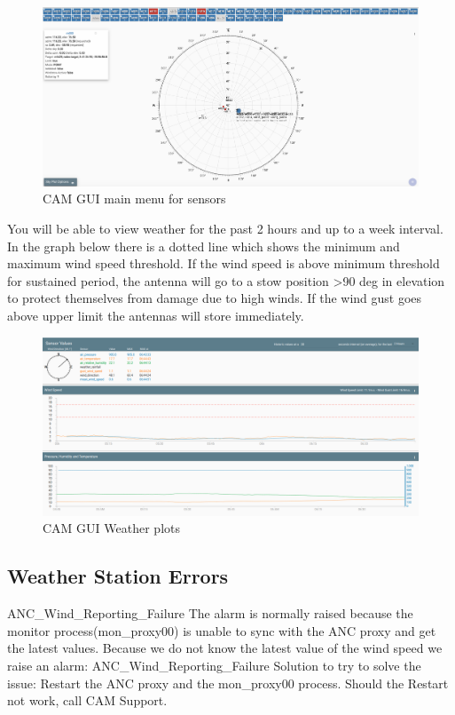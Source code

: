 \begin{figure}[!thb]
	\centering
	\includegraphics[scale=0.23]{Chapters/images/image76.png}
	
	\caption{CAM GUI main menu for sensors}
	\label{fig:image76}
\end{figure}

You will be able to view weather for the past 2 hours and up to a week interval. In the graph below there is a dotted line which shows the minimum and maximum wind speed threshold. If the wind speed is above minimum threshold for sustained period, the antenna will go to a stow position >90 deg in elevation to protect themselves from damage due to high winds.  If the wind gust goes above upper limit the antennas will store immediately.



\begin{figure}[!thb]
	\centering
	\includegraphics[scale=0.23]{Chapters/images/image56.png}
	
	\caption{CAM GUI Weather plots}
	\label{fig:image56}
\end{figure}

\subsection{ Weather Station Errors}
ANC\_Wind\_Reporting\_Failure
The alarm is normally raised because the monitor process(mon\_proxy00) is unable to sync with the ANC proxy and get the latest values. Because we do not know the latest value of the wind speed we raise an alarm: ANC\_Wind\_Reporting\_Failure
Solution to try to solve the issue: Restart the ANC proxy and the mon\_proxy00 process. Should the Restart not work, call CAM Support.

